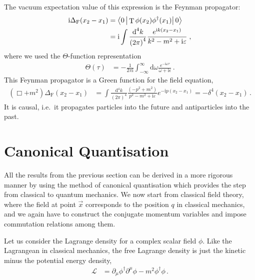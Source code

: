 \documentclass[12pt]{report}
\renewcommand{\L}{\ensuremath{\mathscr{L}}}
\renewcommand{\d}{\text{d}}
\newcommand{\braopket}[3]{\ensuremath{\left\langle#1\left|\vphantom{#1 #3} #2\right|#3 \right\rangle}}
\DeclareMathOperator{\T}{T}
\renewcommand{\i}{\ensuremath{\text{i}}}
\newcommand{\2}{\ensuremath{\sqrt{2}\,}}
\renewcommand{\d}{\ensuremath{\text{d}}}
\renewcommand{\L}{\ensuremath{\mathscr{L}}}
\begin{document}
{      The vacuum expectation value of this expression is the Feynman propagator:
      \begin{align}
        \begin{split}
          \i \Delta_\text{F} (x_2-x_1)&=\braopket{0}{\T \phi(x_2)\phi^\dagger(x_1)}{0}\\
          &= \i\int \frac{\d^4 k}{\left(2\pi\right)^4} \frac{e^{\i k (x_2-x_1)}}{k^2-m^2 +\i
            \varepsilon}\;, 
        \end{split}
      \end{align}
      where we used the $\Theta$-function representation
      \begin{align}
        \Theta(\tau)&= -\frac{1}{2\pi\i} \int_{-\infty}^\infty \!\!\d \omega
        \frac{e^{-\i\omega\tau}}{\omega+\i\epsilon} \,.
      \end{align}
      This Feynman propagator is a Green function for the field equation,
      \begin{align}
          \left(\Box + m^2\right) \Delta_\text{F} (x_2-x_1) &=\int \frac{\d^4
            k}{\left(2\pi\right)^4} \frac{\left(-p^2 +m^2\right)}{p^2-m^2 +\i \varepsilon} e^{-\i
            p\left(x_2-x_1\right)} = -\delta^4\left(x_2-x_1\right)\,.
      \end{align}
      It is causal,  i.e.\ it propagates particles into the future and antiparticles into the
      past. 

      \section{Canonical Quantisation}
      All the results from the previous section can be derived in a more rigorous manner by  
      using the method of canonical quantisation which provides the step from classical to quantum
      mechanics. We now start from classical field theory, where the field at point $\vec{x}$
      corresponds to the position $q$ in classical mechanics, and we again have to construct the 
      conjugate momentum variables and impose commutation relations among them.

      Let us consider the Lagrange density
      for a complex scalar field $\phi$. Like the Lagrangean in classical mechanics, the
      free Lagrange density is just the kinetic minus the potential energy density,
      \begin{align}\label{eq:Lscalarfree}
        \L&= \partial_\mu \phi^\dagger \partial^\mu \phi- m^2 \phi^\dagger \phi\,.
      \end{align}
      
}
\end{document}
